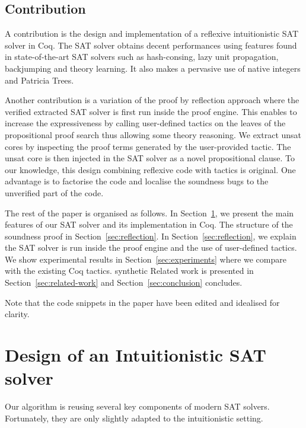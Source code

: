 \documentclass[a4paper,UKenglish,cleveref, autoref, thm-restate]{lipics-v2019}
\begin{document}
\subsection{Contribution}

A contribution is the design and implementation of a reflexive
intuitionistic SAT solver in Coq.  The SAT solver obtains decent
performances using features found in state-of-the-art SAT solvers such
as hash-consing, lazy unit propagation, backjumping and theory
learning. It also makes a pervasive use of native integers and
Patricia Trees.


Another contribution is a variation of the proof by reflection
approach where the verified extracted SAT solver is first run inside
the proof engine. This enables to increase the expressiveness by
calling user-defined tactics on the leaves of the propositional proof
search thus allowing some theory reasoning.
%
We extract unsat cores by inspecting the proof terms generated by the
user-provided tactic. The unsat core is then injected in the SAT
solver as a novel propositional clause. To our knowledge, this design
combining reflexive code with tactics is original. One advantage is to
factorise the code and localise the soundness bugs to the unverified part of the
code.

The rest of the paper is organised as follows.
%
In Section~\ref{sec:design}, we present the main features of our SAT
solver and its implementation in Coq.
%
The structure of the soundness proof in Section~\ref{sec:reflection}.
%
In Section~\ref{sec:reflection}, we explain the SAT solver is run
inside the proof engine and the use of user-defined tactics.
%
We show experimental results in Section~\ref{sec:experiments} where we
compare with the existing Coq tactics.  synthetic
%
Related work is presented in Section~\ref{sec:related-work} and
Section~\ref{sec:conclusion} concludes.

Note that the code snippets in the paper have been edited and
idealised for clarity. 

\section{Design of an Intuitionistic SAT solver}
\label{sec:design}

Our algorithm is reusing several key components of modern SAT
solvers. Fortunately, they are only slightly adapted to the
intuitionistic setting.
\end{document}
